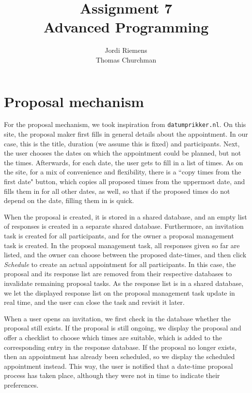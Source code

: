 \documentclass{article}
\title{Assignment 7\\\normalsize{Advanced Programming}}
\author{Jordi Riemens\\Thomas Churchman}
\begin{document}
	\maketitle
	
	\section{Proposal mechanism}
    For the proposal mechanism, we took inspiration from \texttt{datumprikker.nl}.
    On this site, the proposal maker first fills in general details about the appointment. In our case, this is the title, duration (we assume this is fixed) and participants.
    Next, the user chooses the dates on which the appointment could be planned, but not the times. Afterwards, for each date, the user gets to fill in a list of times.
    As on the site, for a mix of convenience and flexibility, there is a ``copy times from the first date" button, which copies all proposed times from the uppermost date,
    and fills them in for all other dates, as well, so that if the proposed times do not depend on the date, filling them in is quick.
    
    When the proposal is created, it is stored in a shared database, and an empty list of responses is created in a separate shared database.
    Furthermore, an invitation task is created for all participants, and for the owner a proposal management task is created.
    In the proposal management task, all responses given so far are listed, and the owner can choose between the proposed date-times, and then click \emph{Schedule} to create an actual appointment for all participants.
    In this case, the proposal and its response list are removed from their respective databases to invalidate remaining proposal tasks.
    As the response list is in a shared database, we let the displayed response list on the proposal management task update in real time, and the user can close the task and revisit it later.
    
    When a user opens an invitation, we first check in the database whether the proposal still exists.
    If the proposal is still ongoing, we display the proposal and offer a checklist to choose which times are suitable, which is added to the corresponding entry in the response database.
    If the proposal no longer exists, then an appointment has already been scheduled, so we display the scheduled appointment instead.
    This way, the user is notified that a date-time proposal process has taken place, although they were not in time to indicate their preferences.
    
\end{document}
